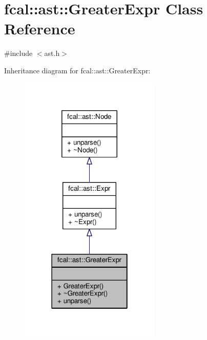 \hypertarget{classfcal_1_1ast_1_1GreaterExpr}{}\section{fcal\+:\+:ast\+:\+:Greater\+Expr Class Reference}
\label{classfcal_1_1ast_1_1GreaterExpr}


{\ttfamily \#include $<$ast.\+h$>$}



Inheritance diagram for fcal\+:\+:ast\+:\+:Greater\+Expr\+:
\nopagebreak
\begin{figure}[H]
\begin{center}
\leavevmode
\includegraphics[width=190pt]{classfcal_1_1ast_1_1GreaterExpr__inherit__graph}
\end{center}
\end{figure}


